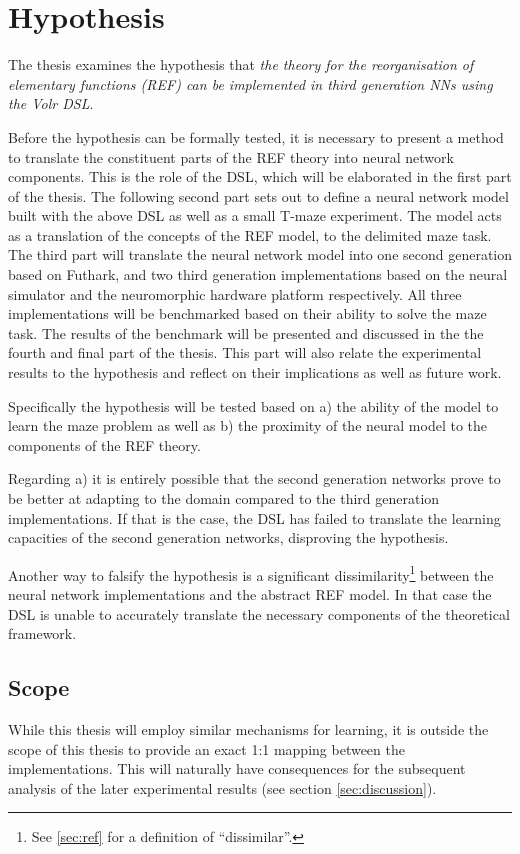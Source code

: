 \documentclass[report.tex]{subfiles}
\begin{document}
\section{Hypothesis} \label{ref:hypothesis}
The thesis examines the hypothesis that 
\textit{the theory for the reorganisation of elementary functions
(\gls{REF}) can be implemented in third generation \gls{NN}s using
the Volr DSL}.

Before the hypothesis can be formally tested, it is necessary to
present a method to translate the constituent parts of the \gls{REF} theory
into neural network components.
This is the role of the \gls{DSL}, which will be elaborated
in the first part of the thesis.
The following second part sets out to define a neural network
model built with the above \gls{DSL} as well as a small T-maze experiment. 
The model acts as a translation of the concepts of the \gls{REF} model,
to the delimited maze task.
The third part will translate the neural network model 
into one second generation based on Futhark, and two third
generation implementations based on the neural simulator  and 
the neuromorphic hardware platform  respectively.
All three implementations will be benchmarked based on their ability 
to solve the maze task.
The results of the benchmark will be presented and discussed in the the
fourth and final part of the thesis.
This part will also relate the experimental results to the
hypothesis and reflect on their implications as well as future work.

Specifically the hypothesis will be tested based on
a) the ability of the model to learn the maze problem as well as 
b) the proximity of the neural model to the components of the
\gls{REF} theory.

Regarding a) it is entirely possible that the second generation networks prove
to be better at adapting to the domain compared to the third generation
implementations.
If that is the case, the \gls{DSL} has failed to translate
the learning capacities of the second generation networks, disproving the
hypothesis.

Another way to falsify the hypothesis is a significant
dissimilarity\footnote{See \ref{sec:ref} for a definition of
\enquote{dissimilar}.} between the neural network implementations 
and the abstract \gls{REF} model. 
In that case the \gls{DSL} is unable to accurately translate the
necessary components of the theoretical framework.

\subsection{Scope} \label{sec:scope}
While this thesis will employ similar mechanisms for learning, 
it is outside the scope of this thesis to provide an exact 1:1 mapping
between the implementations.
This will naturally have consequences for the subsequent analysis of the
later experimental results (see section \ref{sec:discussion}).
\end{document}
